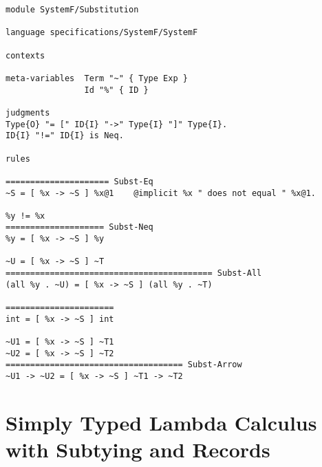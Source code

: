 \newpage
\begin{lstlisting}[language=sltc]
module SystemF/Substitution

language specifications/SystemF/SystemF

contexts

meta-variables  Term "~" { Type Exp }
                Id "%" { ID }

judgments
Type{O} "= [" ID{I} "->" Type{I} "]" Type{I}.
ID{I} "!=" ID{I} is Neq.

rules

===================== Subst-Eq
~S = [ %x -> ~S ] %x@1    @implicit %x " does not equal " %x@1.

%y != %x
==================== Subst-Neq
%y = [ %x -> ~S ] %y

~U = [ %x -> ~S ] ~T
========================================== Subst-All
(all %y . ~U) = [ %x -> ~S ] (all %y . ~T)

======================
int = [ %x -> ~S ] int

~U1 = [ %x -> ~S ] ~T1
~U2 = [ %x -> ~S ] ~T2
==================================== Subst-Arrow
~U1 -> ~U2 = [ %x -> ~S ] ~T1 -> ~T2
\end{lstlisting}

\section{Simply Typed Lambda Calculus with Subtying and Records}
\label{appendix:stlc-records}

